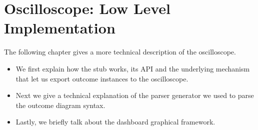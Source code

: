 \chapter{Oscilloscope: Low Level Implementation}
    The following chapter gives a more technical description of the oscilloscope.
    \begin{itemize}
        \item We first explain how the stub works, its API and the underlying mechanism that let us export outcome instances to the oscilloscope.
        \item Next we give a technical explanation of the parser generator we used to parse the outcome diagram syntax.
        \item Lastly, we briefly talk about the dashboard graphical framework.
    \end{itemize}


    
    
